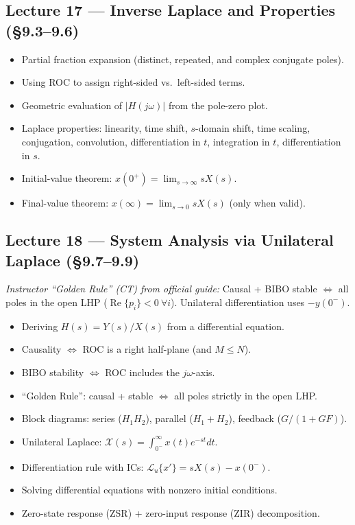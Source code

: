 \documentclass{article}
\begin{document}
\subsection*{Lecture 17 --- Inverse Laplace and Properties (\S9.3--9.6)}
\begin{itemize}
  \item Partial fraction expansion (distinct, repeated, and complex conjugate poles).
  \item Using ROC to assign right-sided vs.\ left-sided terms.
  \item Geometric evaluation of $|H(j\omega)|$ from the pole-zero plot.
  \item Laplace properties: linearity, time shift, $s$-domain shift, time scaling, conjugation, convolution, differentiation in $t$, integration in $t$, differentiation in $s$.
  \item Initial-value theorem: $x(0^+) = \lim_{s\to\infty} s X(s)$.
  \item Final-value theorem: $x(\infty) = \lim_{s\to 0} s X(s)$ (only when valid).
\end{itemize}

\subsection*{Lecture 18 --- System Analysis via Unilateral Laplace (\S9.7--9.9)}

\noindent\emph{Instructor ``Golden Rule'' (CT) from official guide:} Causal + BIBO stable $\iff$ all poles in the open LHP ($\operatorname{Re}\{p_i\} < 0\ \forall i$). Unilateral differentiation uses \textbf{$-y(0^-)$}.

\begin{itemize}
  \item Deriving $H(s) = Y(s)/X(s)$ from a differential equation.
  \item Causality $\Leftrightarrow$ ROC is a right half-plane (and $M \le N$).
  \item BIBO stability $\Leftrightarrow$ ROC includes the $j\omega$-axis.
  \item ``Golden Rule'': causal + stable $\Leftrightarrow$ all poles strictly in the open LHP.
  \item Block diagrams: series ($H_1 H_2$), parallel ($H_1 + H_2$), feedback ($G/(1+GF)$).
  \item Unilateral Laplace: $\mathcal{X}(s) = \int_{0^-}^\infty x(t)e^{-st}dt$.
  \item Differentiation rule with ICs: $\mathcal{L}_u\{x'\} = sX(s) - x(0^-)$.
  \item Solving differential equations with nonzero initial conditions.
  \item Zero-state response (ZSR) + zero-input response (ZIR) decomposition.
\end{itemize}
\end{document}
